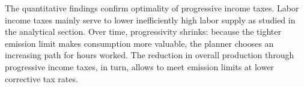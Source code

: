  

  



The quantitative findings confirm optimality of progressive income taxes. 
Labor income taxes mainly serve to lower inefficiently high labor supply as studied in the analytical section.
Over time, progressivity shrinks: because the tighter emission limit makes consumption more valuable, the planner chooses an increasing path for hours worked. The reduction in overall production through progressive income taxes, in turn, allows to meet emission limits at lower corrective tax rates. 

